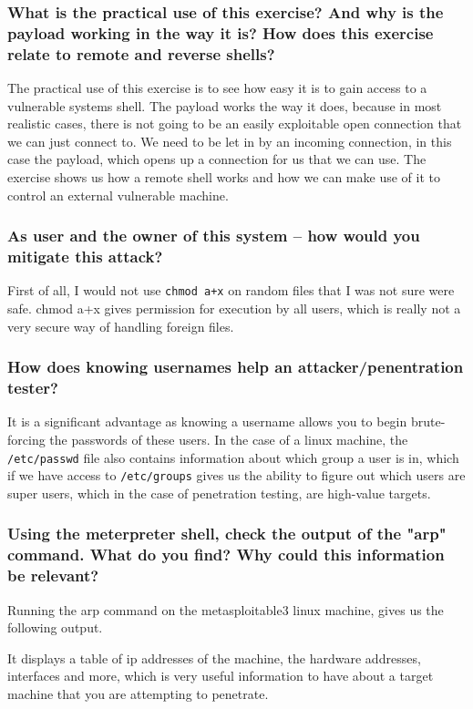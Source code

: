 \subsubsection{What is the practical use of this exercise? And why is the payload working in the way it is? How does this exercise relate to remote and reverse shells?}
The practical use of this exercise is to see how easy it is to gain access to a vulnerable systems shell. The payload works the way it does, because in most realistic cases, there is not going to be an easily exploitable open connection that we can just connect to. We need to be let in by an incoming connection, in this case the payload, which opens up a connection for us that we can use. The exercise shows us how a remote shell works and how we can make use of it to control an external vulnerable machine.

\subsubsection{As user and the owner of this system -- how would you mitigate this attack?}
First of all, I would not use \texttt{chmod a+x} on random files that I was not sure were safe. chmod a+x gives permission for execution by all users, which is really not a very secure way of handling foreign files.

\subsubsection{How does knowing usernames help an attacker/penentration tester?}
It is a significant advantage as knowing a username allows you to begin brute-forcing the passwords of these users. In the case of a linux machine, the \texttt{/etc/passwd} file also contains information about which group a user is in, which if we have access to \texttt{/etc/groups} gives us the ability to figure out which users are super users, which in the case of penetration testing, are high-value targets.

\subsubsection{Using the meterpreter shell, check the output of the "arp" command. What do you find? Why could this information be relevant?}
Running the arp command on the metasploitable3 linux machine, gives us the following output.


It displays a table of ip addresses of the machine, the hardware addresses, interfaces and more, which is very useful information to have about a target machine that you are attempting to penetrate.


